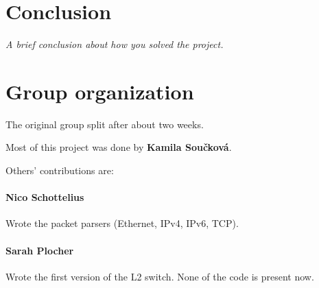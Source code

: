 \documentclass[11pt,oneside,a4paper]{article}
\newcommand{\hint}[1]{{\color{blue} \em #1}}
\begin{document}
\section{Conclusion}
\hint{A brief conclusion about how you solved the project.} \\
\lipsum[1]

\label{lastpage} %
\clearpage
{}



\clearpage
\appendix
{}

\section{Group organization}
The original group split after about two weeks.

Most of this project was done by \textbf{Kamila Sou\v{c}kov\'{a}}.

Others' contributions are:

\paragraph{Nico Schottelius}
Wrote the packet parsers (Ethernet, IPv4, IPv6, TCP).

\paragraph{Sarah Plocher}
Wrote the first version of the L2 switch.
None of the code is present now.
\end{document}
